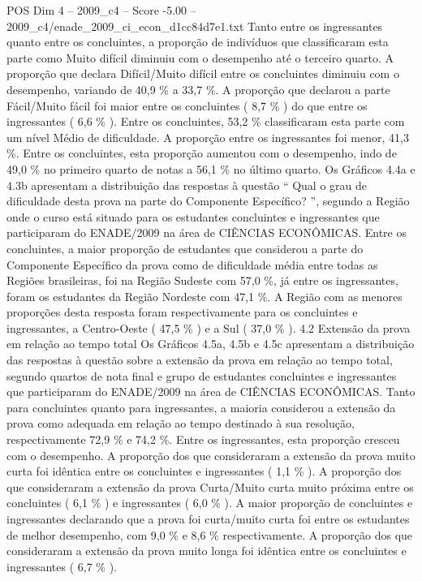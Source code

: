 \begin{textsample}{POS Dim 4 – 2009\_c4 – Score -5.00 – 2009\_c4/enade\_2009\_ci\_econ\_d1cc84d7e1.txt}
Tanto entre os ingressantes quanto entre os concluintes, a proporção de indivíduos que classificaram esta parte como Muito difícil diminuiu com o desempenho até o terceiro quarto.
A proporção que declara Difícil/Muito difícil entre os concluintes diminuiu com o desempenho, variando de 40,9 \% a 33,7 \%.
A proporção que declarou a parte Fácil/Muito fácil foi maior entre os concluintes ( 8,7 \% ) do que entre os ingressantes ( 6,6 \% ).
Entre os concluintes, 53,2 \% classificaram esta parte com um nível Médio de dificuldade.
A proporção entre os ingressantes foi menor, 41,3 \%.
Entre os concluintes, esta proporção aumentou com o desempenho, indo de 49,0 \% no primeiro quarto de notas a 56,1 \% no último quarto.
Os Gráficos 4.4a e 4.3b apresentam a distribuição das respostas à questão “ Qual o grau de dificuldade desta prova na parte do Componente Específico? ”, segundo a Região onde o curso está situado para os estudantes concluintes e ingressantes que participaram do ENADE/2009 na área de CIÊNCIAS ECONÔMICAS.
Entre os concluintes, a maior proporção de estudantes que considerou a parte do Componente Específico da prova como de dificuldade média entre todas as Regiões brasileiras, foi na Região Sudeste com 57,0 \%, já entre os ingressantes, foram os estudantes da Região Nordeste com 47,1 \%.
A Região com as menores proporções desta resposta foram respectivamente para os concluintes e ingressantes, a Centro-Oeste ( 47,5 \% ) e a Sul ( 37,0 \% ). 4.2 Extensão da prova em relação ao tempo total Os Gráficos 4.5a, 4.5b e 4.5c apresentam a distribuição das respostas à questão sobre a extensão da prova em relação ao tempo total, segundo quartos de nota final e grupo de estudantes concluintes e ingressantes que participaram do ENADE/2009 na área de CIÊNCIAS ECONÔMICAS.
Tanto para concluintes quanto para ingressantes, a maioria considerou a extensão da prova como adequada em relação ao tempo destinado à sua resolução, respectivamente 72,9 \% e 74,2 \%.
Entre os ingressantes, esta proporção cresceu com o desempenho.
A proporção dos que consideraram a extensão da prova muito curta foi idêntica entre os concluintes e ingressantes ( 1,1 \% ).
A proporção dos que consideraram a extensão da prova Curta/Muito curta muito próxima entre os concluintes ( 6,1 \% ) e ingressantes ( 6,0 \% ).
A maior proporção de concluintes e ingressantes declarando que a prova foi curta/muito curta foi entre os estudantes de melhor desempenho, com 9,0 \% e 8,6 \% respectivamente.
A proporção dos que consideraram a extensão da prova muito longa foi idêntica entre os concluintes e ingressantes ( 6,7 \% ).

\end{textsample}
